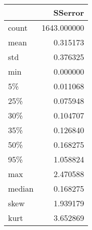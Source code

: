 \begin{tabular}{lr}
\toprule
{} &      SSerror \\
\midrule
count  &  1643.000000 \\
mean   &     0.315173 \\
std    &     0.376325 \\
min    &     0.000000 \\
5\%     &     0.011068 \\
25\%    &     0.075948 \\
30\%    &     0.104707 \\
35\%    &     0.126840 \\
50\%    &     0.168275 \\
95\%    &     1.058824 \\
max    &     2.470588 \\
median &     0.168275 \\
skew   &     1.939179 \\
kurt   &     3.652869 \\
\bottomrule
\end{tabular}
